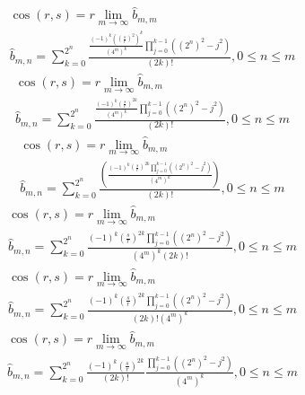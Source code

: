 \documentclass[a4paper,12pt]{report}
\begin{document}
\begin{subequations}
\begin{gather}
\cos(r,s) = r \lim \limits_{m \to \infty} \hat{b}_{m,m} \\
\hat{b}_{m,n} = \sum \limits_{k=0}^{2^n} \frac{\frac{(-1)^k \left(\left(\frac{s}{r}\right)^2\right)^k}{(4^m)^k} \prod \limits_{j=0}^{k-1} ((2^n)^2 - j^2)}{(2k)!}, 0 \leq n \leq m
\end{gather}
\end{subequations}
\begin{subequations}
\begin{gather}
\cos(r,s) = r \lim \limits_{m \to \infty} \hat{b}_{m,m} \\
\hat{b}_{m,n} = \sum \limits_{k=0}^{2^n} \frac{\frac{(-1)^k \left(\frac{s}{r}\right)^{2k}}{(4^m)^k} \prod \limits_{j=0}^{k-1} ((2^n)^2 - j^2)}{(2k)!}, 0 \leq n \leq m
\end{gather}
\end{subequations}
\begin{subequations}
\begin{gather}
\cos(r,s) = r \lim \limits_{m \to \infty} \hat{b}_{m,m} \\
\hat{b}_{m,n} = \sum \limits_{k=0}^{2^n} \frac{\left(\frac{(-1)^k \left(\frac{s}{r}\right)^{2k} \prod \limits_{j=0}^{k-1} ((2^n)^2 - j^2)}{(4^m)^k}\right)}{(2k)!}, 0 \leq n \leq m
\end{gather}
\end{subequations}
\begin{subequations}
\begin{gather}
\cos(r,s) = r \lim \limits_{m \to \infty} \hat{b}_{m,m} \\
\hat{b}_{m,n} = \sum \limits_{k=0}^{2^n} \frac{(-1)^k \left(\frac{s}{r}\right)^{2k} \prod \limits_{j=0}^{k-1} ((2^n)^2 - j^2)}{(4^m)^k (2k)!}, 0 \leq n \leq m
\end{gather}
\end{subequations}
\begin{subequations}
\begin{gather}
\cos(r,s) = r \lim \limits_{m \to \infty} \hat{b}_{m,m} \\
\hat{b}_{m,n} = \sum \limits_{k=0}^{2^n} \frac{(-1)^k \left(\frac{s}{r}\right)^{2k} \prod \limits_{j=0}^{k-1} ((2^n)^2 - j^2)}{(2k)! (4^m)^k}, 0 \leq n \leq m
\end{gather}
\end{subequations}
\begin{subequations}
\begin{gather}
\cos(r,s) = r \lim \limits_{m \to \infty} \hat{b}_{m,m} \\
\hat{b}_{m,n} = \sum \limits_{k=0}^{2^n} \frac{(-1)^k \left(\frac{s}{r}\right)^{2k}}{(2k)!} \frac{\prod \limits_{j=0}^{k-1} ((2^n)^2 - j^2)}{(4^m)^k}, 0 \leq n \leq m
\end{gather}
\end{subequations}
\end{document}
